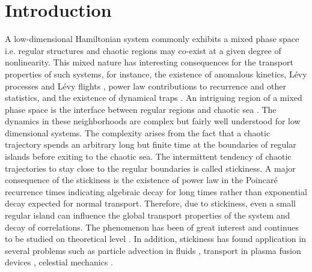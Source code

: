 \documentclass[reprint,amsmath,amssymb,aps,pre]{revtex4-1}
\begin{document}
\section{Introduction} 
A low-dimensional Hamiltonian system commonly exhibits a mixed phase space 
i.e. regular structures and chaotic regions may co-exist at a given degree of 
nonlinearity. This mixed nature has interesting consequences for the transport
properties of such systems, for instance, the existence of anomalous kinetics,
L\'{e}vy processes and L\'{e}vy flights \cite{Klafter1994,Zaburdaev2015}, 
power law contributions to recurrence and other statistics, and the existence 
of dynamical traps \cite{Zaslavsky2002a,Zaslavsky2002b}. An intriguing region 
of a mixed phase space is the interface between regular regions and chaotic 
sea \cite{Mackay1984, Easton1993}. The dynamics in these neighborhoods are 
complex but fairly well understood \cite{Meiss2015} for low dimensional 
systems. The complexity arises from the fact that a chaotic trajectory spends 
an arbitrary long but finite time at the boundaries of regular islands before 
exiting to the chaotic sea. The intermittent tendency of chaotic trajectories 
to stay close to the regular boundaries is called stickiness. A major 
consequence of the stickiness is  the existence of power law in the 
Poincar{\'e} recurrence times indicating algebraic decay for long 
times rather than exponential decay expected for normal transport. 
Therefore, due to stickiness, even a small regular island can influence the 
global transport properties of the system and decay of correlations. The 
phenomenon has been of great interest and continues to be studied on 
theoretical level \cite{Altmann2006, Altmann2010,Livorati2012,Bunimovich2012, 
Kruger2015, Lange2016}. In addition, stickiness has found application in 
several problems such as particle advection in fluids 
\cite{Babiano1994,Tel2005}, transport in 
plasma fusion devices \cite{Szezech2012,Martins2014}, celestial mechanics 
\cite{Efthymiopoulos1999, Harsoula2010, Harsoula2016}.
\end{document}
